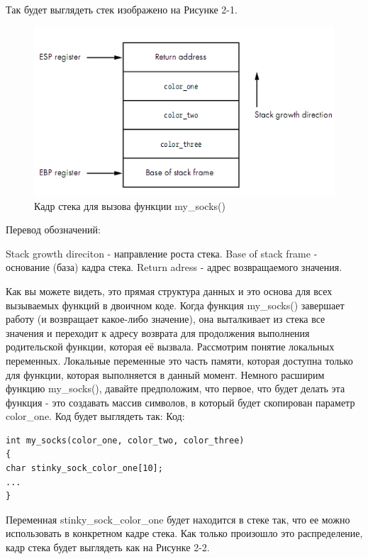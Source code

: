 \documentclass[12pt]{book}
\begin{document}
Так будет выглядеть стек изображено на Рисунке 2-1.
\begin{figure}
  \center
  \includegraphics{./pic/chap2/1.PNG}
  \caption{Кадр стека для вызова функции my\_socks()}
\end{figure}

Перевод обозначений:

    Stack growth direciton - направление роста стека.
    Base of stack frame - основание (база) кадра стека.
    Return adress - адрес возвращаемого значения.


Как вы можете видеть, это прямая структура данных и это основа для всех вызываемых функций в двоичном коде. Когда функция my\_socks() завершает работу (и возвращает какое-либо значение), она выталкивает из стека все значения и переходит к адресу возврата для продолжения выполнения родительской функции, которая её вызвала. Рассмотрим понятие локальных переменных. Локальные переменные это часть памяти, которая доступна только для функции, которая выполняется в данный момент. Немного расширим функцию my\_socks(), давайте предположим, что первое, что будет делать эта функция - это создавать массив символов, в который будет скопирован параметр color\_one. Код будет выглядеть так:
Код:
\begin{lstlisting}
int my_socks(color_one, color_two, color_three)
{
char stinky_sock_color_one[10];
...
}
\end{lstlisting}
Переменная stinky\_sock\_color\_one будет находится в стеке так, что ее можно использовать в конкретном кадре стека. Как только произошло это распределение, кадр стека будет выглядеть как на Рисунке 2-2.
\end{document}
